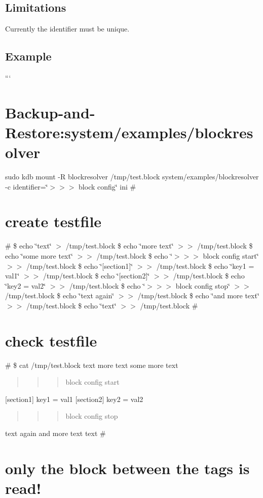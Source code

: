 \subsection*{Limitations}

Currently the identifier must be unique.

\subsection*{Example}

``` \section*{Backup-\/and-\/\+Restore\+:system/examples/blockresolver}

sudo kdb mount -\/\+R blockresolver /tmp/test.block system/examples/blockresolver -\/c identifier=\char`\"{}$>$$>$$>$ block config\char`\"{} ini \# \section*{create testfile}

\# \$ echo \char`\"{}text\char`\"{} $>$ /tmp/test.block \$ echo \char`\"{}more text\char`\"{} $>$$>$ /tmp/test.block \$ echo \char`\"{}some more text\char`\"{} $>$$>$ /tmp/test.block \$ echo \char`\"{}$>$$>$$>$ block config start\char`\"{} $>$$>$ /tmp/test.block \$ echo \char`\"{}\mbox{[}section1\mbox{]}\char`\"{} $>$$>$ /tmp/test.block \$ echo \char`\"{}key1 = val1\char`\"{} $>$$>$ /tmp/test.block \$ echo \char`\"{}\mbox{[}section2\mbox{]}\char`\"{} $>$$>$ /tmp/test.block \$ echo \char`\"{}key2 = val2\char`\"{} $>$$>$ /tmp/test.block \$ echo \char`\"{}$>$$>$$>$ block config stop\char`\"{} $>$$>$ /tmp/test.block \$ echo \char`\"{}text again\char`\"{} $>$$>$ /tmp/test.block \$ echo \char`\"{}and more text\char`\"{} $>$$>$ /tmp/test.block \$ echo \char`\"{}text\char`\"{} $>$$>$ /tmp/test.block \# \section*{check testfile}

\# \$ cat /tmp/test.block text more text some more text \begin{quote}
\begin{quote}
\begin{quote}
block config start \end{quote}
\end{quote}
\end{quote}
\mbox{[}section1\mbox{]} key1 = val1 \mbox{[}section2\mbox{]} key2 = val2 \begin{quote}
\begin{quote}
\begin{quote}
block config stop \end{quote}
\end{quote}
\end{quote}
text again and more text text \# \section*{only the block between the tags is read!}


